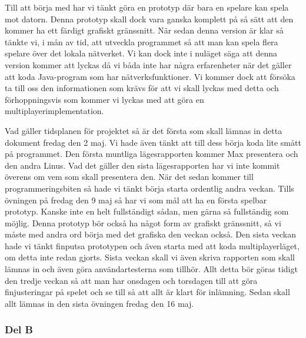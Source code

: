 \documentclass[10pt,a4paper]{article}
\begin{document}
Till att börja med har vi tänkt göra en prototyp där bara en spelare kan
spela mot datorn. Denna prototyp skall dock vara ganska komplett på så sätt
att den kommer ha ett färdigt grafiskt gränssnitt. När sedan denna version
är klar så tänkte vi, i mån av tid, att utveckla programmet så att man kan
spela flera spelare över det lokala nätverket. Vi kan dock inte i nuläget
säga att denna version kommer att lyckas då vi båda inte har några
erfarenheter när det gäller att koda Java-program som har
nätverksfunktioner. Vi kommer dock att försöka ta till oss den
informationen som krävs för att vi skall lyckas med detta och
förhoppningsvis som kommer vi lyckas med att göra en
multiplayerimplementation.

Vad gäller tidsplanen för projektet så är det första som skall lämnas in
detta dokument fredag den 2 maj. Vi hade även tänkt att till dess börja
koda lite smått på programmet. Den första muntliga lägesrapporten kommer
Max presentera och den andra Linus. Vad det gäller den sista lägesrapporten
har vi inte kommit överens om vem som skall presentera den. När det sedan
kommer till programmeringsbiten så hade vi tänkt börja starta ordentlig
andra veckan. Tills övningen på fredag den 9 maj så har vi som mål att ha
en första spelbar prototyp. Kanske inte en helt fullständigt sådan, men
gärna så fullständig som möjlig. Denna prototyp bör också ha något form av
grafiskt gränssnitt, så vi måste med andra ord börja med det grafiska den
veckan också. Den sista veckan hade vi tänkt finputsa prototypen och även
starta med att koda multiplayerläget, om detta inte redan gjorts. Sista
veckan skall vi även skriva rapporten som skall lämnas in och även göra
användartesterna som tillhör. Allt detta bör göras tidigt den tredje veckan
så att man har onsdagen och torsdagen till att göra finjusteringar på
spelet och se till så att allt är klart för inlämning. Sedan skall allt
lämnas in den sista övningen fredag den 16 maj.

\subsubsection*{Del B}
\end{document}
